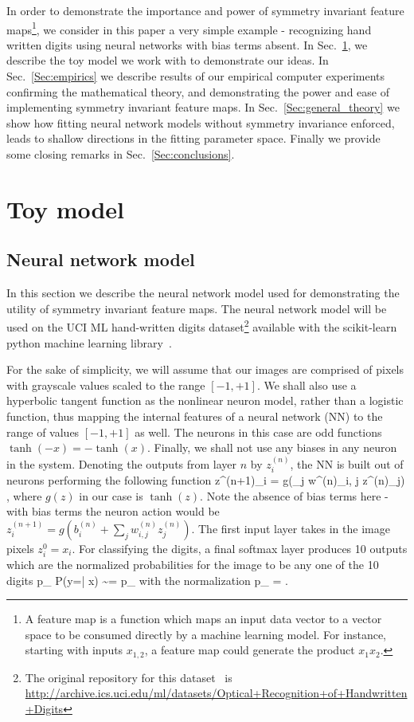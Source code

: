 \documentclass{svproc}
\begin{document}
In order to demonstrate the importance and power of symmetry invariant feature maps\footnote{A feature map is a function which maps an input data vector to a vector space to be consumed directly by a machine learning model. For instance, starting with inputs $x_{1,2}$, a feature map could generate the product $x_1 x_2$.}, we consider in this paper a very simple example - recognizing hand written digits using neural networks with bias terms absent. In Sec.~\ref{Sec:model}, we describe the toy model we work with to demonstrate our ideas. In Sec.~\ref{Sec:empirics} we describe results of our empirical computer experiments confirming the mathematical theory, and demonstrating the power and ease of implementing symmetry invariant feature maps. In Sec.~\ref{Sec:general_theory} we show how fitting neural network models without symmetry invariance enforced, leads to shallow directions in the fitting parameter space. Finally we provide some closing remarks in Sec.~\ref{Sec:conclusions}.


\section{Toy model}\label{Sec:model}
\subsection{Neural network model}\label{Sec:dumb_NN}

In this section we describe the neural network model used for demonstrating the utility of symmetry invariant feature maps. The neural network model will be used on the UCI ML hand-written digits dataset\footnote{The original repository for this dataset~\cite{Dua:2017} is \url{http://archive.ics.uci.edu/ml/datasets/Optical+Recognition+of+Handwritten+Digits}} available with the scikit-learn python machine learning library~\cite{scikit-learn}.

For the sake of simplicity, we will assume that our images are comprised of pixels with grayscale values scaled to the range $[-1,+1]$. We shall also use a hyperbolic tangent function as the nonlinear neuron model, rather than a logistic function, thus mapping the internal features of a neural network (NN) to the range of values $[-1, +1]$ as well. The neurons in this case are odd functions $\tanh(-x) = - \tanh(x)$. Finally, we shall not use any biases in any neuron in the system. Denoting the outputs from layer $n$ by $z^{(n)}_i$, the NN is built out of neurons performing the following function
\be
z^{(n+1)}_i = g\left(\sum_j w^{(n)}_{i, j} z^{(n)}_j\right)
\; ,
\ee
where $g(z)$ in our case is $\tanh(z)$. Note the absence of bias terms here - with bias terms the neuron action would be 
$ z^{(n+1)}_i = g\left(b^{(n)}_i + \sum_j w^{(n)}_{i, j} z^{(n)}_j\right) $. The first input layer takes in the image pixels $z^0_i = x_i$. For classifying the digits, a final softmax layer produces 10 outputs which are the normalized probabilities for the image to be any one of the 10 digits
\be\label{softmax_1}
p_{\alpha} \equiv P(y=\alpha | x) \sim \exp{} = {\tilde p}_{\alpha}
\ee
with the normalization
\be\label{softmax_2}
p_{\alpha} = 
\; .
\ee
\end{document}
